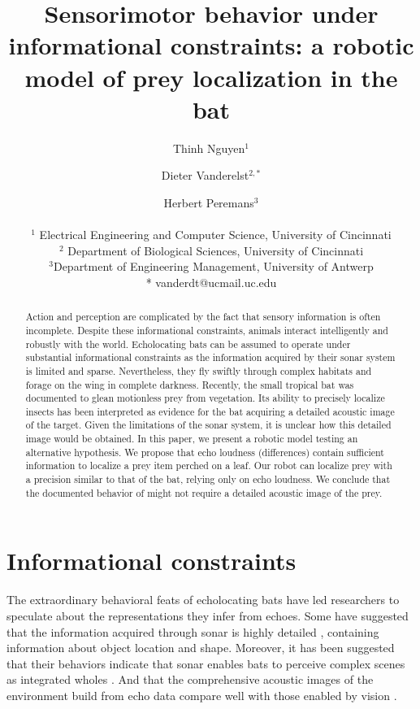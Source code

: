 \documentclass[letterpaper]{article}
\title{Sensorimotor behavior under informational constraints: a robotic model of prey localization in the bat \animal{mm}}
\author{Thinh Nguyen$^{1}$\and Dieter Vanderelst$^{2, *}$ \and Herbert Peremans$^{3}$\\
\mbox{}\\
$^1$ Electrical Engineering and Computer Science, University of Cincinnati\\
$^2$ Department of Biological Sciences, University of Cincinnati\\
$^3$Department of Engineering Management, University of Antwerp\\
* vanderdt@ucmail.uc.edu} %
\begin{document}
\maketitle

\begin{abstract}
Action and perception are complicated by the fact that sensory information is often incomplete. Despite these informational constraints, animals interact intelligently and robustly with the world. Echolocating bats can be assumed to operate under substantial informational constraints as the information acquired by their sonar system is limited and sparse. Nevertheless, they fly swiftly through complex habitats and forage on the wing in complete darkness. Recently, the small tropical bat  was documented to glean motionless prey from vegetation. Its ability to precisely localize insects has been interpreted as evidence for the bat acquiring a detailed acoustic image of the target. Given the limitations of the sonar system, it is unclear how this detailed image would be obtained. In this paper, we present a robotic model testing an alternative hypothesis. We propose that echo loudness (differences) contain sufficient information to localize a prey item perched on a leaf. Our robot can localize prey with a precision similar to that of the bat, relying only on echo loudness. We conclude that the documented behavior of  might not require a detailed acoustic image of the prey.
\end{abstract}

\section{Informational constraints}

The extraordinary behavioral feats of echolocating bats have led researchers to speculate about the representations they infer from echoes. Some have suggested that the information acquired through sonar is highly detailed \citep{Simmons2012,Ulanovsky2008,Geipel2013}, containing information about object location and shape. Moreover, it has been suggested that their behaviors indicate that sonar enables bats to perceive complex scenes as integrated wholes \citep{Barchi2013}. And that the comprehensive acoustic images \citep{Clare2015} of the environment \citep{Lee2017} build from echo data compare well with those enabled by vision \citep{Moss2001}.
\end{document}
